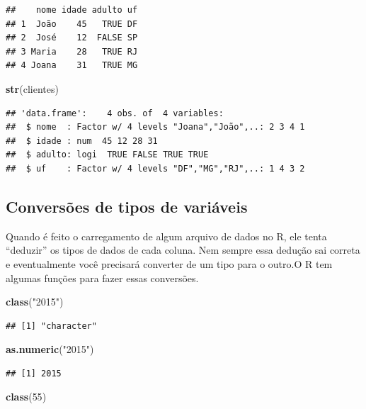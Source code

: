 \documentclass[]{book}
\newenvironment{Shaded}{\begin{snugshade}}{\end{snugshade}}
\newcommand{\KeywordTok}[1]{\textcolor[rgb]{0.13,0.29,0.53}{\textbf{#1}}}
\newcommand{\DecValTok}[1]{\textcolor[rgb]{0.00,0.00,0.81}{#1}}
\newcommand{\StringTok}[1]{\textcolor[rgb]{0.31,0.60,0.02}{#1}}
\newcommand{\NormalTok}[1]{#1}
\begin{document}
\begin{verbatim}
##    nome idade adulto uf
## 1  João    45   TRUE DF
## 2  José    12  FALSE SP
## 3 Maria    28   TRUE RJ
## 4 Joana    31   TRUE MG
\end{verbatim}

\begin{Shaded}
\begin{Highlighting}[]
\KeywordTok{str}\NormalTok{(clientes)}
\end{Highlighting}
\end{Shaded}

\begin{verbatim}
## 'data.frame':    4 obs. of  4 variables:
##  $ nome  : Factor w/ 4 levels "Joana","João",..: 2 3 4 1
##  $ idade : num  45 12 28 31
##  $ adulto: logi  TRUE FALSE TRUE TRUE
##  $ uf    : Factor w/ 4 levels "DF","MG","RJ",..: 1 4 3 2
\end{verbatim}

\subsection{Conversões de tipos de
variáveis}\label{conversoes-de-tipos-de-variaveis}

Quando é feito o carregamento de algum arquivo de dados no R, ele tenta
``deduzir'' os tipos de dados de cada coluna. Nem sempre essa dedução
sai correta e eventualmente você precisará converter de um tipo para o
outro.O R tem algumas funções para fazer essas conversões.

\begin{Shaded}
\begin{Highlighting}[]
\KeywordTok{class}\NormalTok{(}\StringTok{"2015"}\NormalTok{)}
\end{Highlighting}
\end{Shaded}

\begin{verbatim}
## [1] "character"
\end{verbatim}

\begin{Shaded}
\begin{Highlighting}[]
\KeywordTok{as.numeric}\NormalTok{(}\StringTok{"2015"}\NormalTok{)}
\end{Highlighting}
\end{Shaded}

\begin{verbatim}
## [1] 2015
\end{verbatim}

\begin{Shaded}
\begin{Highlighting}[]
\KeywordTok{class}\NormalTok{(}\DecValTok{55}\NormalTok{)}
\end{Highlighting}
\end{Shaded}
\end{document}
